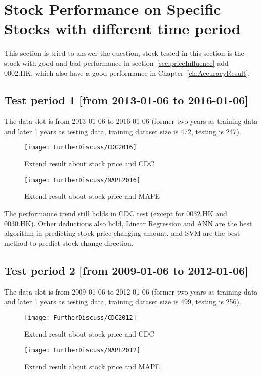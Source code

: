 \section{Stock Performance on Specific Stocks with different time period}
This section is tried to answer the question, stock tested in this section is the stock with good and bad performance in section~\ref{sec:priceInfluence} add 0002.HK, which also have a good performance in Chapter~\ref{ch:AccuracyResult}.\\

\subsection{Test period 1 [from 2013-01-06 to 2016-01-06]}
The data slot is from 2013-01-06 to 2016-01-06 (former two years as training data and later 1 years as testing data, training dataset size is 472, testing is 247).

\begin{figure}[h]
	\centering
	\texttt{[image: FurtherDiscuss/CDC2016]}
	\caption{Extend result about stock price and CDC}
	\label{fg:furtherCDC2016}
\end{figure}


\begin{figure}[h]
	\centering
	\texttt{[image: FurtherDiscuss/MAPE2016]}
	\caption{Extend result about stock price and MAPE}
	\label{fg:furtherMAPE2016}
\end{figure}
\clearpage
The performance trend still holds in CDC test (except for 0032.HK and 0030.HK). Other deductions also hold, Linear Regression and ANN are the best algorithm in predicting stock price changing amount, and SVM are the best method to predict stock change direction.

\subsection{Test period 2 [from 2009-01-06 to 2012-01-06]}
The data slot is from 2009-01-06 to 2012-01-06 (former two years as training data and later 1 years as testing data, training dataset size is 499, testing is 256).

\begin{figure}[h]
	\centering
	\texttt{[image: FurtherDiscuss/CDC2012]}
	\caption{Extend result about stock price and CDC}
	\label{fg:furtherCDC2012}
\end{figure}


\begin{figure}[h]
	\centering
	\texttt{[image: FurtherDiscuss/MAPE2012]}
	\caption{Extend result about stock price and MAPE}
	\label{fg:furtherMAPE2012}
\end{figure}

